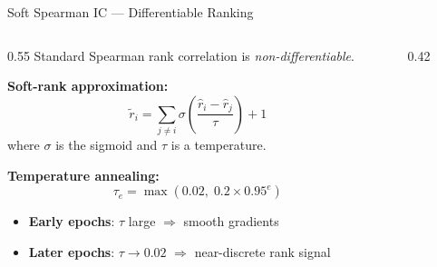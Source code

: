 \documentclass[aspectratio=169, 10pt]{beamer}
\begin{document}
\begin{frame}{Soft Spearman IC — Differentiable Ranking}
  \begin{columns}[T]
    \begin{column}{0.55\textwidth}
      Standard Spearman rank correlation is \emph{non-differentiable}.

      \textbf{Soft-rank approximation:}
      \[
        \tilde{r}_i = \sum_{j \neq i} \sigma\!\left(\frac{\hat{r}_i - \hat{r}_j}{\tau}\right)
        + 1
      \]
      where $\sigma$ is the sigmoid and $\tau$ is a temperature.

      \textbf{Temperature annealing:}
      \[
        \tau_e = \max(0.02,\; 0.2 \times 0.95^e)
      \]
      \begin{itemize}
        \item \textbf{Early epochs}: $\tau$ large $\Rightarrow$ smooth gradients
        \item \textbf{Later epochs}: $\tau \to 0.02$ $\Rightarrow$ near-discrete rank signal
      \end{itemize}
    \end{column}
    \begin{column}{0.42\textwidth}
    \end{column}
  \end{columns}
\end{frame}
\end{document}
